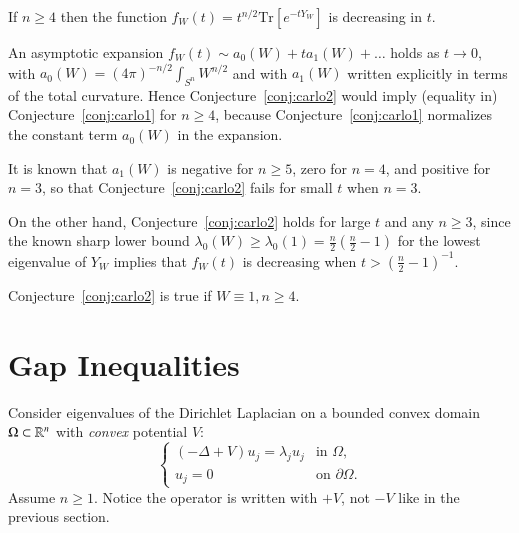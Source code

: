 \documentclass[12pt,letterpaper, reqno]{aimpl}
\begin{document}
\begin{problemblock}

\begin{conjecture}[2.83] \label{conj:carlo2}
 If $n \geq 4$ then the
function $f_W(t) = t^{n/2} \text{Tr}[e^{-tY_W}]$ is decreasing in
$t$.
\end{conjecture}


\begin{remark}
An asymptotic expansion $f_W(t) \sim a_0(W)+ t a_1(W)+\ldots$ holds
as $t \to 0$, with $a_0(W)= (4\pi)^{-n/2} \int_{S^n} W^{n/2}$ and
with $a_1(W)$ written explicitly in terms of the total curvature.
Hence Conjecture~\ref{conj:carlo2} would imply (equality in) Conjecture~\ref{conj:carlo1} for $n
\geq 4$, because Conjecture~\ref{conj:carlo1} normalizes the constant term $a_0(W)$
in the expansion.
\end{remark}

\begin{remark}
It is known that $a_1(W)$ is negative for $n \geq 5$, zero for
$n=4$, and positive for $n=3$, so that Conjecture~\ref{conj:carlo2} fails for small
$t$ when $n=3$.

On the other hand, Conjecture~\ref{conj:carlo2} holds for large $t$ and any $n \geq
3$, since the known sharp lower bound $\lambda_0(W) \geq
\lambda_0(1)= \frac{n}{2} \left( \frac{n}{2}-1 \right)$ for the
lowest eigenvalue of $Y_W$ implies that $f_W(t)$ is decreasing when
$t > \left( \frac{n}{2}-1 \right)^{-1}$.
\end{remark}

\begin{remark}
Conjecture~\ref{conj:carlo2} is true if $W \equiv 1, n \geq 4$.
\end{remark}


\end{problemblock}

\section{Gap Inequalities}

 Consider eigenvalues of the
Dirichlet Laplacian on a bounded convex domain $\Omega \subset \mathbb R^n$
with \emph{convex} potential $V$:
\[
\begin{cases}
(-\Delta + V) u_j = \lambda_j u_j  & \text{in $\Omega$,} \\
u_j = 0 & \text{on $\partial \Omega$.}
\end{cases}
\]
Assume $n \geq 1$. Notice the operator is written with $+V$, not
$-V$ like in the previous section.
\end{document}
